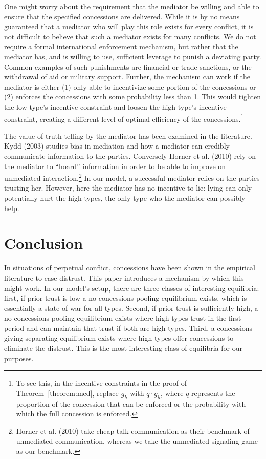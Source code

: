 \documentclass[12pt, letterpaper]{article}
\begin{document}
One might worry about the requirement that the mediator be willing and able to ensure that the specified concessions are delivered. While it is by no means guaranteed that a mediator who will play this role exists for every conflict, it is not difficult to believe that such a mediator exists for many conflicts. We do not require a formal international enforcement mechanism, but rather that the mediator has, and is willing to use, sufficient leverage to punish a deviating party. Common examples of such punishments are financial or trade sanctions, or the withdrawal of aid or military support. Further, the mechanism can work if the mediator is either (1) only able to incentivize some portion of the concessions or (2) enforces the concessions with some probability less than 1. This would tighten the low type's incentive constraint and loosen the high type's incentive constraint, creating a different level of optimal efficiency of the concessions.\footnote{To see this, in the incentive constraints in the proof of Theorem~\ref{theorem:med}, replace $g_h$ with $q \cdot g_h$, where $q$ represents the proportion of the concession that can be enforced or the probability with which the full concession is enforced.} 

The value of truth telling by the mediator has been examined in the literature. Kydd (2003) studies bias in mediation and how a mediator can credibly communicate information to the parties. Conversely Horner et al. (2010) rely on the mediator to ``hoard'' information in order to be able to improve on unmediated interaction.\footnote{Horner et al. (2010) take cheap talk communication as their benchmark of unmediated communication, whereas we take the unmediated signaling game as our benchmark.} In our model, a successful mediator relies on the parties trusting her. However, here the mediator has no incentive to lie: lying can only potentially hurt the high types, the only type who the mediator can possibly help.


\section{Conclusion}
In situations of perpetual conflict, concessions have been shown in the empirical literature to ease distrust. This paper introduces a mechanism by which this might work. In our model's setup, there are three classes of interesting equilibria: first, if prior trust is low a no-concessions pooling equilibrium exists, which is essentially a state of war for all types. Second, if prior trust is sufficiently high, a no-concessions pooling equilibrium exists where high types trust in the first period and can maintain that trust if both are high types. Third, a concessions giving separating equilibrium exists where high types offer concessions to eliminate the distrust. This is the most interesting class of equilibria for our purposes.
\end{document}

